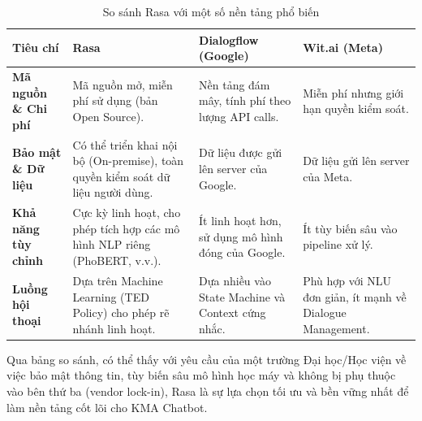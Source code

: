 \begin{table}[H]
\centering
\caption{So sánh Rasa với một số nền tảng phổ biến}
\label{tab:comparison-rasa}
\begin{tabular}{|p{3.5cm}|p{4.5cm}|p{4.5cm}|p{3.5cm}|}
\hline
\textbf{Tiêu chí} & \textbf{Rasa} & \textbf{Dialogflow (Google)} & \textbf{Wit.ai (Meta)} \\ \hline
\textbf{Mã nguồn \& Chi phí} & Mã nguồn mở, miễn phí sử dụng (bản Open Source). & Nền tảng đám mây, tính phí theo lượng API calls. & Miễn phí nhưng giới hạn quyền kiểm soát. \\ \hline
\textbf{Bảo mật \& Dữ liệu} & Có thể triển khai nội bộ (On-premise), toàn quyền kiểm soát dữ liệu người dùng. & Dữ liệu được gửi lên server của Google. & Dữ liệu gửi lên server của Meta. \\ \hline
\textbf{Khả năng tùy chỉnh} & Cực kỳ linh hoạt, cho phép tích hợp các mô hình NLP riêng (PhoBERT, v.v.). & Ít linh hoạt hơn, sử dụng mô hình đóng của Google. & Ít tùy biến sâu vào pipeline xử lý. \\ \hline
\textbf{Luồng hội thoại} & Dựa trên Machine Learning (TED Policy) cho phép rẽ nhánh linh hoạt. & Dựa nhiều vào State Machine và Context cứng nhắc. & Phù hợp với NLU đơn giản, ít mạnh về Dialogue Management. \\ \hline
\end{tabular}
\end{table}

Qua bảng so sánh, có thể thấy với yêu cầu của một trường Đại học/Học viện về việc bảo mật thông tin, tùy biến sâu mô hình học máy và không bị phụ thuộc vào bên thứ ba (vendor lock-in), Rasa là sự lựa chọn tối ưu và bền vững nhất để làm nền tảng cốt lõi cho KMA Chatbot.
